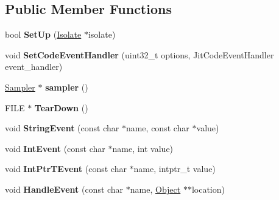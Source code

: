 \subsection*{Public Member Functions}
\begin{DoxyCompactItemize}
\item 
\hypertarget{classv8_1_1internal_1_1_logger_a57c1357e2efcb8f18a9463b3738de1c3}{}bool {\bfseries Set\+Up} (\hyperlink{classv8_1_1internal_1_1_isolate}{Isolate} $\ast$isolate)\label{classv8_1_1internal_1_1_logger_a57c1357e2efcb8f18a9463b3738de1c3}

\item 
\hypertarget{classv8_1_1internal_1_1_logger_a89f5788193b8b60cc23095b01b303278}{}void {\bfseries Set\+Code\+Event\+Handler} (uint32\+\_\+t options, Jit\+Code\+Event\+Handler event\+\_\+handler)\label{classv8_1_1internal_1_1_logger_a89f5788193b8b60cc23095b01b303278}

\item 
\hypertarget{classv8_1_1internal_1_1_logger_acf51f58956bd045ccc28dda5ae9b8c6f}{}\hyperlink{classv8_1_1internal_1_1_sampler}{Sampler} $\ast$ {\bfseries sampler} ()\label{classv8_1_1internal_1_1_logger_acf51f58956bd045ccc28dda5ae9b8c6f}

\item 
\hypertarget{classv8_1_1internal_1_1_logger_aecd345473e60fedd6cf022514b460ade}{}F\+I\+L\+E $\ast$ {\bfseries Tear\+Down} ()\label{classv8_1_1internal_1_1_logger_aecd345473e60fedd6cf022514b460ade}

\item 
\hypertarget{classv8_1_1internal_1_1_logger_aa5b4d8a0c983f1302a86943394481ef8}{}void {\bfseries String\+Event} (const char $\ast$name, const char $\ast$value)\label{classv8_1_1internal_1_1_logger_aa5b4d8a0c983f1302a86943394481ef8}

\item 
\hypertarget{classv8_1_1internal_1_1_logger_a2131d6668b5dc5de810e87ebaeb532a5}{}void {\bfseries Int\+Event} (const char $\ast$name, int value)\label{classv8_1_1internal_1_1_logger_a2131d6668b5dc5de810e87ebaeb532a5}

\item 
\hypertarget{classv8_1_1internal_1_1_logger_add38edf4ef5cb1d654eb9cac76f53136}{}void {\bfseries Int\+Ptr\+T\+Event} (const char $\ast$name, intptr\+\_\+t value)\label{classv8_1_1internal_1_1_logger_add38edf4ef5cb1d654eb9cac76f53136}

\item 
\hypertarget{classv8_1_1internal_1_1_logger_a9e188e7c13b6993687d7926dea865047}{}void {\bfseries Handle\+Event} (const char $\ast$name, \hyperlink{classv8_1_1internal_1_1_object}{Object} $\ast$$\ast$location)\label{classv8_1_1internal_1_1_logger_a9e188e7c13b6993687d7926dea865047}


\end{DoxyCompactItemize}
